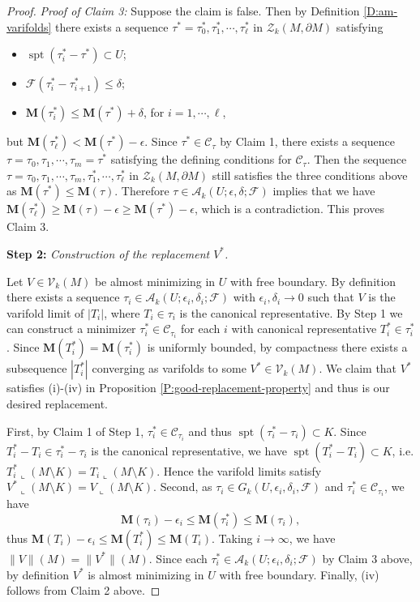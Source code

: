 \documentclass[10pt]{amsart}
\theoremstyle{definition}
\theoremstyle{remark}
\numberwithin{equation}{section}
\newcommand{\V}{\mathcal{V}}
\newcommand{\F}{\mathcal{F}}
\newcommand{\C}{\mathcal{C}}
\newcommand{\lc}{\llcorner}
\newcommand{\de}{\delta}
\newcommand{\ep}{\epsilon}
\newcommand{\Z}{\mathcal{Z}}
\newcommand{\M}{\mathbf{M}}
\newcommand{\sA}{\mathscr{A}}
\newcommand{\spt}{\operatorname{spt}}
\begin{document}
\begin{proof}
\textit{Proof of Claim 3:} Suppose the claim is false. Then by Definition \ref{D:am-varifolds} there exists a sequence $\tau^*=\tau^*_0, \tau^*_1, \cdots, \tau^*_\ell $ in $\Z_k(M, \partial M)$ satisfying
\begin{itemize}
\item $\spt(\tau^*_i-\tau^*)\subset U$;
\item $\F(\tau^*_i - \tau^*_{i+1})\leq \de$;
\item $\M(\tau^*_i)\leq \M(\tau^*)+\de$, for $i=1, \cdots, \ell$,
\end{itemize}
but $\M(\tau^*_\ell) < \M(\tau^*)-\ep$. Since $\tau^* \in \C_\tau$ by Claim 1, there exists a sequence $\tau=\tau_0, \tau_1, \cdots, \tau_m=\tau^*$ satisfying the defining conditions for $\C_\tau$. Then the sequence $\tau=\tau_0,\tau_1,\cdots,\tau_m, \tau^*_1, \cdots, \tau^*_\ell$ in $\Z_k(M, \partial M)$ still satisfies the three conditions above as $\M(\tau^*)\leq \M(\tau)$. Therefore $\tau\in \sA_k(U;\ep,\de;\F)$ implies that we have $\M(\tau^*_\ell)\geq \M(\tau)-\ep\geq \M(\tau^*)-\ep$, which is a contradiction. This proves Claim 3. 


\vspace{0.3cm}
\noindent \textbf{Step 2:} \textit{Construction of the replacement $V^*$.}

Let $V\in \V_k(M)$ be almost minimizing in $U$ with free boundary. By definition there exists a sequence $\tau_i\in \sA_k(U; \ep_i, \de_i; \F)$ with $\ep_i, \de_i \to 0$ such that $V$ is the varifold limit of $|T_i|$, where $T_i \in \tau_i$ is the canonical representative. By Step 1 we can construct a minimizer $\tau_i^* \in \C_{\tau_i}$ for each $i$ with canonical representative $T_i^* \in \tau_i^*$. Since $\M(T_i^*)=\M(\tau_i^*)$ is uniformly bounded, by compactness there exists a subsequence $|T_i^*|$ converging as varifolds to some $V^* \in \V_k(M)$. We claim that $V^*$ satisfies (i)-(iv) in Proposition \ref{P:good-replacement-property} and thus is our desired replacement. 

First, by Claim 1 of Step 1, $\tau_i^* \in \C_{\tau_i}$ and thus $\spt(\tau_i^*- \tau_i) \subset K$. Since $T_i^*-T_i \in \tau_i^*-\tau_i$ is the canonical representative, we have $\spt(T_i^* -T_i) \subset K$, i.e. $T_i^*\lc (M \setminus  K)=T_i\lc (M \setminus K)$. Hence the varifold limits satisfy $V^* \lc (M \setminus K) = V \lc (M \setminus K)$. Second, as $\tau_i \in G_k(U,\ep_i,\de_i,\F)$ and $\tau_i^* \in \C_{\tau_i}$, we have 
\[  \M(\tau_i)-\ep_i\leq \M(\tau_i^*)\leq \M(\tau_i),  \]
thus $\M(T_i)-\ep_i\leq \M(T_i^*)\leq \M(T_i)$. Taking $i \to \infty$, we have $\|V\|(M)=\|V^{*}\|(M)$. Since each $\tau_i^* \in \sA_k(U; \ep_i, \de_i; \F)$ by Claim 3 above, by definition $V^*$ is almost minimizing in $U$ with free boundary. Finally, (iv) follows from Claim 2 above. 
\end{proof}
\end{document}

